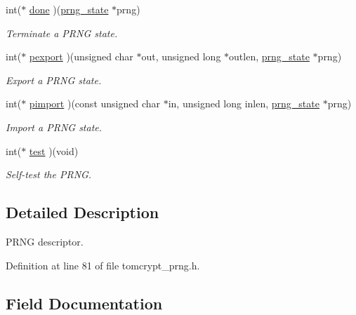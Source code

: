 \begin{DoxyCompactItemize}
int($\ast$ \mbox{\hyperlink{structltc__prng__descriptor_a525c67b6e5d71539a34c94861223ebd1}{done}} )(\mbox{\hyperlink{structprng__state}{prng\+\_\+state}} $\ast$prng)
\begin{DoxyCompactList}\small\item\em Terminate a P\+R\+NG state. \end{DoxyCompactList}\item 
int($\ast$ \mbox{\hyperlink{structltc__prng__descriptor_aa156d23f4baa6a992ce17150596c1b57}{pexport}} )(unsigned char $\ast$out, unsigned long $\ast$outlen, \mbox{\hyperlink{structprng__state}{prng\+\_\+state}} $\ast$prng)
\begin{DoxyCompactList}\small\item\em Export a P\+R\+NG state. \end{DoxyCompactList}\item 
int($\ast$ \mbox{\hyperlink{structltc__prng__descriptor_aa88bd4aa3ef1edd1907f07dcc547ac4a}{pimport}} )(const unsigned char $\ast$in, unsigned long inlen, \mbox{\hyperlink{structprng__state}{prng\+\_\+state}} $\ast$prng)
\begin{DoxyCompactList}\small\item\em Import a P\+R\+NG state. \end{DoxyCompactList}\item 
int($\ast$ \mbox{\hyperlink{structltc__prng__descriptor_aa8a3657bce888625318110283a80c363}{test}} )(void)
\begin{DoxyCompactList}\small\item\em Self-\/test the P\+R\+NG. \end{DoxyCompactList}\end{DoxyCompactItemize}


\subsection{Detailed Description}
P\+R\+NG descriptor. 

Definition at line 81 of file tomcrypt\+\_\+prng.\+h.



\subsection{Field Documentation}
\mbox{\label{structltc__prng__descriptor_acf1a2cad13724ad580a83b8e6d91bcd2}} 
